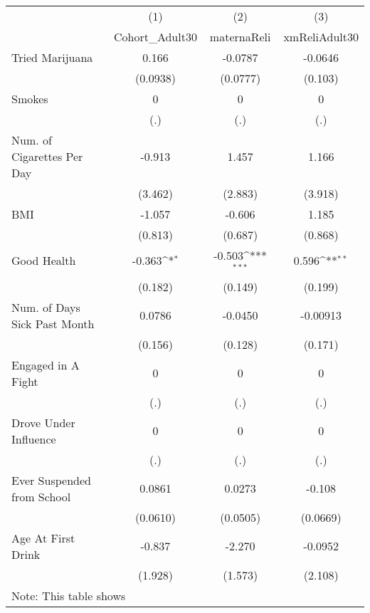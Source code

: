 {
\def\sym#1{\ifmmode^{#1}\else\(^{#1}\)\fi}
\begin{tabular}{l*{3}{c}}
\hline\hline
            &\multicolumn{1}{c}{(1)}&\multicolumn{1}{c}{(2)}&\multicolumn{1}{c}{(3)}\\
            &\multicolumn{1}{c}{Cohort\_Adult30}&\multicolumn{1}{c}{maternaReli}&\multicolumn{1}{c}{xmReliAdult30}\\
\hline
Tried Marijuana&       0.166         &     -0.0787         &     -0.0646         \\
            &    (0.0938)         &    (0.0777)         &     (0.103)         \\
[1em]
Smokes      &           0         &           0         &           0         \\
            &         (.)         &         (.)         &         (.)         \\
[1em]
Num. of Cigarettes Per Day&      -0.913         &       1.457         &       1.166         \\
            &     (3.462)         &     (2.883)         &     (3.918)         \\
[1em]
BMI         &      -1.057         &      -0.606         &       1.185         \\
            &     (0.813)         &     (0.687)         &     (0.868)         \\
[1em]
Good Health &      -0.363\sym{*}  &      -0.503\sym{***}&       0.596\sym{**} \\
            &     (0.182)         &     (0.149)         &     (0.199)         \\
[1em]
Num. of Days Sick Past Month&      0.0786         &     -0.0450         &    -0.00913         \\
            &     (0.156)         &     (0.128)         &     (0.171)         \\
[1em]
Engaged in A Fight&           0         &           0         &           0         \\
            &         (.)         &         (.)         &         (.)         \\
[1em]
Drove Under Influence&           0         &           0         &           0         \\
            &         (.)         &         (.)         &         (.)         \\
[1em]
Ever Suspended from School&      0.0861         &      0.0273         &      -0.108         \\
            &    (0.0610)         &    (0.0505)         &    (0.0669)         \\
[1em]
Age At First Drink&      -0.837         &      -2.270         &     -0.0952         \\
            &     (1.928)         &     (1.573)         &     (2.108)         \\
\hline\hline
\multicolumn{4}{l}{\footnotesize Note: This table shows}\\
\end{tabular}
}
